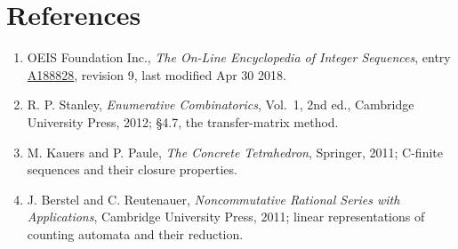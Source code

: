 \documentclass[11pt]{article}
\theoremstyle{definition}
\begin{document}
\section{References}

\begin{enumerate}

\item OEIS Foundation Inc., \emph{The On-Line Encyclopedia of Integer Sequences}, entry \href{https://oeis.org/A188828}{A188828}, revision 9, last modified Apr 30 2018.

\item R. P. Stanley, \emph{Enumerative Combinatorics}, Vol.~1, 2nd ed., Cambridge University Press, 2012; \S4.7, the transfer-matrix method.

\item M. Kauers and P. Paule, \emph{The Concrete Tetrahedron}, Springer, 2011; C-finite sequences and their closure properties.

\item J. Berstel and C. Reutenauer, \emph{Noncommutative Rational Series with Applications}, Cambridge University Press, 2011; linear representations of counting automata and their reduction.

\end{enumerate}
\end{document}
